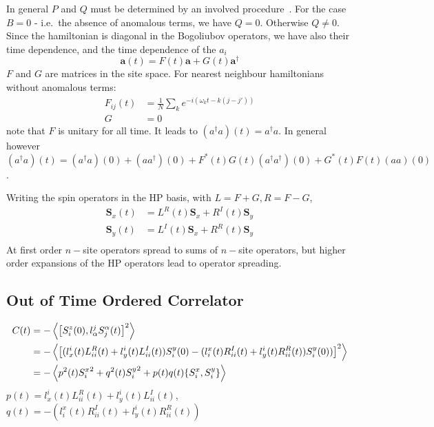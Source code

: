 \documentclass{article}
\let\vec\bm
\begin{document}
In general $P$ and $Q$ must be determined by an involved procedure~\cite{colpa}.
For the case $B=0$ - i.e.\ the absence of anomalous terms, we have $Q=0$. 
Otherwise $Q \neq 0$.
Since the hamiltonian is diagonal in the Bogoliubov operators, we have also their time dependence, and the time dependence of the $a_i$
\begin{equation}
    \vec{a}(t) = F(t) \vec{a} + G(t) \vec{a}^\dagger
\end{equation}
$F$ and $G$ are matrices in the site space. 
For nearest neighbour hamiltonians without anomalous terms: 
\begin{align}
    F_{ij}(t)&= \frac{1}{N} \sum_k e^{-i(\omega_k t - k(j-j'))}\\
    G &= 0
\end{align}
note that $F$ is unitary for all time.
It leads to $(a^\dagger a)(t) = a^\dagger a$. 
In general however $(a^\dagger a)(t) = (a^\dagger a)(0)+(aa^\dagger)(0)+F^*(t)G(t)(a^\dagger a^\dagger)(0) + G^*(t)F(t)(a a)(0)$.

Writing the spin operators in the HP basis, with $L = F+G, R=F-G$,
\begin{align}
    \vec{S}_x(t) &= L^R(t)\vec{S}_x + R^I(t)\vec{S}_y\\
    \vec{S}_y(t) &= L^I(t)\vec{S}_x + R^R(t)\vec{S}_y\\
\end{align}
At first order $n-$site operators spread to sums of $n-$site operators, but higher order expansions of the HP operators lead to operator spreading.
%
\subsection{Out of Time Ordered Correlator}
%
\begin{align}
    C(t) &= -\ev{\comm{S_i^z(0)}{l^j_\alpha S_j^\alpha(t)}^2}\\
         &= -\ev{\left[(l^i_x(t) L^R_{ii}(t)+ l^i_y(t) L^I_{ii}(t)) S_i^y(0)-(l_i^x(t)R^I_{ii}(t) + l^i_y(t) R^R_{ii}(t))S_i^y(0))\right]^2}\\
         &= -\ev{p^2(t){S_i^x}^2+q^2(t){S_i^y}^2 + p(t)q(t)\acomm{S_i^x}{S_i^y}}
\end{align}
$p(t) = l^i_x(t) L^R_{ii}(t)+ l^i_y(t) L^I_{ii}(t)$, $q(t) =-(l_i^x(t)R^I_{ii}(t) + l^i_y(t) R^R_{ii}(t))$



\end{document}
